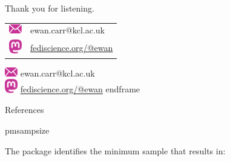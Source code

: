 \documentclass[11pt]{beamer}
\begin{document}
\begin{frame}[t]
	\centering
	\vspace{0.4\textheight}
	Thank you for listening.
	\vfill
    \begin{tabular}{cl}
        \includegraphics[width=1.5em,valign=c]{figures/email.pdf} & \textcolor{KCLhotpink}{ewan.carr@kcl.ac.uk}\\[1.7em] 
        \includegraphics[width=1.5em,valign=c]{figures/mastodon.pdf} & \href{https://fediscience.org/@ewan}{\textcolor{KCLhotpink}{fediscience.org/@ewan}} \\[1.7em]
    
    \end{tabular}
		\includegraphics[width=1.5em,valign=c]{figures/email.pdf}%
		\hspace{0.8em}%
		\textcolor{KCLhotpink}{ewan.carr@kcl.ac.uk}\\[1.7em]
		\includegraphics[width=1.5em,valign=c]{figures/mastodon.pdf}
		\hspace{0.8em}%
		\href{https://fediscience.org/@ewan}{\textcolor{KCLhotpink}{fediscience.org/@ewan}}
end{frame}

\appendix

\begin{frame}[allowframebreaks]{References}
	\renewcommand*{\bibfont}{\scriptsize}
	\printbibliography
\end{frame}

\begin{frame}{pmsampsize}

	The package identifies the minimum sample that results in: \\[1em]

	\centering


\end{frame}
\end{frame}
\end{document}
